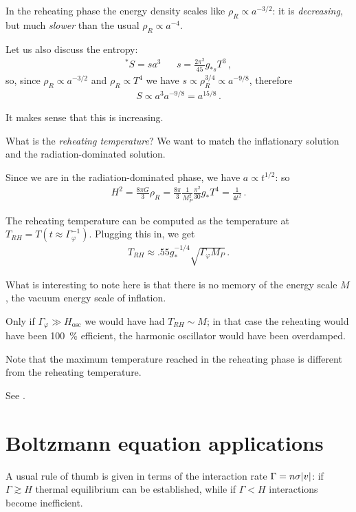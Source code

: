 \documentclass[main.tex]{subfiles}
\begin{document}
In the reheating phase the energy density scales like \(\rho _R \propto a^{- 3/2}\): it is \emph{decreasing}, but much \emph{slower} than the usual \(\rho _R \propto a^{-4}\). 

Let us also discuss the entropy: 
%
\begin{align}
^*S = s a^3 &&
s = \frac{2 \pi^2}{45} g_{*s} T^3
\,,
\end{align}
%
so, since \(\rho _R \propto a^{-3/2}\) and \(\rho _R \propto T^{4}\) we have \(s \propto \rho _R^{3/4} \propto a^{- 9/8}\), therefore
%
\begin{align}
S \propto a^3 a^{-9/8} = a^{15/8}
\,.
\end{align}

It makes sense that this is increasing. 

What is the \emph{reheating temperature}? We want to match the inflationary solution and the radiation-dominated solution. 

Since we are in the radiation-dominated phase, we have \(a \propto t^{1/2}\): so
%
\begin{align}
H^2 = \frac{8 \pi G}{3} \rho _R = \frac{8 \pi }{3} \frac{1}{M_P^2} \frac{\pi^2}{30} g_* T^{4} = \frac{1}{4t^2}
\,.
\end{align}

The reheating temperature can be computed as the temperature at \(T_{RH} = T (t \approx \Gamma _\varphi^{-1})\). 
Plugging this in, we get 
%
\begin{align}
T_{RH} \approx \num{.55} g_*^{-1/4} \sqrt{\Gamma _\varphi M_P}
\,.
\end{align}

What is interesting to note here is that there is no memory of the energy scale \(M\), the vacuum energy scale of inflation. 

Only if \(\Gamma _\varphi \gg H _{\text{osc}}\) we would have had \(T_{RH} \sim M\); in that case the reheating would have been \SI{100}{\percent} efficient, the harmonic oscillator would have been overdamped. 

Note that the maximum temperature reached in the reheating phase is different from the reheating temperature. 

See \cite[fig.\ 8.3]{kolbEarlyUniverse1994}. 

\section{Boltzmann equation applications}

A usual rule of thumb is given in terms of the interaction rate \(\Gamma = n \sigma \abs{v}\): if \(\Gamma \gtrsim H\) thermal equilibrium can be established, while if \(\Gamma < H\) interactions become inefficient. 
\end{document}
